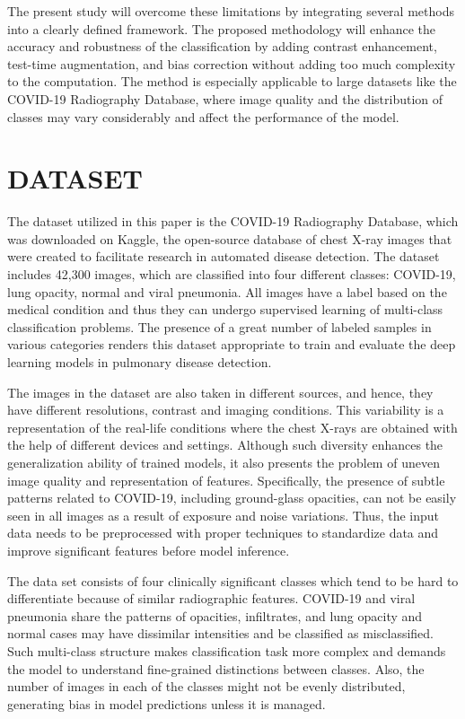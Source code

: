 \documentclass[a4paper,fleqn]{cas-dc}
\begin{document}
The present study will overcome these limitations by integrating several methods into a clearly defined framework. The proposed methodology will enhance the accuracy and robustness of the classification by adding contrast enhancement, test-time augmentation, and bias correction without adding too much complexity to the computation. The method is especially applicable to large datasets like the COVID-19 Radiography Database, where image quality and the distribution of classes may vary considerably and affect the performance of the model.

\section{DATASET}
The dataset utilized in this paper is the COVID-19 Radiography Database, which was downloaded on Kaggle, the open-source database of chest X-ray images that were created to facilitate research in automated disease detection. The dataset includes 42,300 images, which are classified into four different classes: COVID-19, lung opacity, normal and viral pneumonia. All images have a label based on the medical condition and thus they can undergo supervised learning of multi-class classification problems. The presence of a great number of labeled samples in various categories renders this dataset appropriate to train and evaluate the deep learning models in pulmonary disease detection.

The images in the dataset are also taken in different sources, and hence, they have different resolutions, contrast and imaging conditions. This variability is a representation of the real-life conditions where the chest X-rays are obtained with the help of different devices and settings. Although such diversity enhances the generalization ability of trained models, it also presents the problem of uneven image quality and representation of features. Specifically, the presence of subtle patterns related to COVID-19, including ground-glass opacities, can not be easily seen in all images as a result of exposure and noise variations. Thus, the input data needs to be preprocessed with proper techniques to standardize data and improve significant features before model inference.

The data set consists of four clinically significant classes which tend to be hard to differentiate because of similar radiographic features. COVID-19 and viral pneumonia share the patterns of opacities, infiltrates, and lung opacity and normal cases may have dissimilar intensities and be classified as misclassified. Such multi-class structure makes classification task more complex and demands the model to understand fine-grained distinctions between classes. Also, the number of images in each of the classes might not be evenly distributed, generating bias in model predictions unless it is managed.
\end{document}
